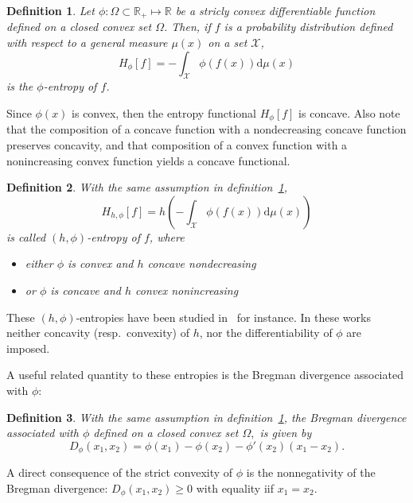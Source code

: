 \documentclass[english,onecolumn]{elsarticle}
\def\dmu{\mathrm{d}\mu}
\def\Rset{\mathbb{R}}
\def\X{\mathcal{X}}
\newtheorem{definition}{Definition}
\begin{document}

\begin{definition}
  Let  $\phi:  \Omega  \subset  \Rset_+  \mapsto  \Rset$  be  a  stricly  convex
  differentiable function defined on a closed convex set $\Omega$.  Then, if $f$
  is  a probability  distribution  defined  with respect  to  a general  measure
  $\mu(x)$ on a set $\X$,
%
\begin{equation}
H_\phi[f] = - \int_{\X} \phi(f(x)) \dmu(x)
\label{eq:phi-entropy}
\end{equation}
%
is the $\phi$-entropy of $f$.
\label{def:phi_entropy}
\end{definition}
%
Since $\phi(x)$ is convex, then the entropy functional $H_{\phi}[f]$ is concave.
Also  note that  the composition  of a  concave function  with a  nondecreasing
concave function preserves concavity, and  that composition of a convex function
with a nonincreasing convex function yields a concave functional.

\begin{definition}%
%
With the same assumption in definition~\ref{def:phi_entropy},
%
\begin{equation}
H_{h,\phi}[f] = h\left( - \int_{\X} \phi(f(x)) \dmu(x) \right)
\label{eq:h-phi-entropy}
\end{equation}
%
is called $(h,\phi)$-entropy of $f$, where
%
\begin{itemize}
\item either $\phi$ is convex  and $h$ concave  nondecreasing
\item or $\phi$ is concave and $h$ convex nonincreasing
\end{itemize}
\end{definition}
%
These  $(h,\phi)$-entropies  have   been  studied  in~\cite{Sal93,MenMor97}  for
instance. In  these works neither concavity  (resp.\ convexity) of  $h$, nor the
differentiability of $\phi$ are imposed.

A  useful  related  quantity  to  these  entropies  is  the  Bregman  divergence
associated with $\phi$:
%
\begin{definition}
  With  the  same assumption  in  definition~\ref{def:phi_entropy}, the  Bregman
  divergence associated with $\phi$ defined  on a closed convex set $\Omega,$ is
  given by
  \begin{equation}
    D_{\phi}(x_1,x_2)=\phi(x_{1})-\phi(x_{2})-\phi'(x_{2})\left(x_{1}-x_{2}\right).
  \end{equation}
  \label{def:Bregman}
\end{definition}
%
A direct consequence  of the strict convexity of $\phi$  is the nonnegativity of
the Bregman divergence: $D_\phi(x_1,x_2) \ge 0$ with equality iif $x_1 = x_2$.
\end{document}
